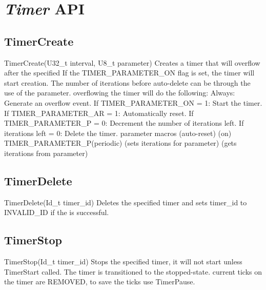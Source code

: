 \section{\textit{Timer} API}

\subsection{TimerCreate}
\label{func:TimerCreate}
\begin{pdfunction}
{TimerCreate(U32\_t interval, U8\_t parameter) }
{ 
Creates a timer that will overflow after the specified 
If the TIMER\_PARAMETER\_ON flag is set, the timer will start 
creation. The number of iterations before auto-delete can be 
through the use of the parameter. 
overflowing the timer will do the following: 
Always: Generate an overflow event. 
If TIMER\_PARAMETER\_ON = 1: Start the timer. 
If TIMER\_PARAMETER\_AR = 1: Automatically reset. 
If TIMER\_PARAMETER\_P = 0: Decrement the number of iterations left. 
If iterations left = 0: Delete the timer. 
parameter macros 
(auto-reset) 
(on) 
TIMER\_PARAMETER\_P(periodic)
(sets iterations for parameter) 
(gets iterations from parameter) }
\end{pdfunction}

\subsection{TimerDelete}
\label{func:TimerDelete}
\begin{pdfunction}
{TimerDelete(Id\_t timer\_id) }
{ 
Deletes the specified timer and sets timer\_id to INVALID\_ID if the 
is successful. }
\end{pdfunction}

\subsection{TimerStop}
\label{func:TimerStop}
\begin{pdfunction}
{TimerStop(Id\_t timer\_id) }
{ 
Stops the specified timer, it will not start unless TimerStart 
called. The timer is transitioned to the stopped-state. 
current ticks on the timer are REMOVED, to save the ticks use TimerPause. }
\end{pdfunction}

